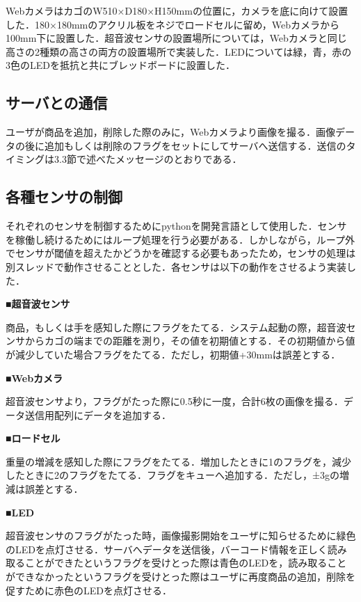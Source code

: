WebカメラはカゴのW510×D180×H150mmの位置に，カメラを底に向けて設置した．180×180mmのアクリル板をネジでロードセルに留め，Webカメラから100mm下に設置した．超音波センサの設置場所については，Webカメラと同じ高さの2種類の高さの両方の設置場所で実装した．LEDについては緑，青，赤の3色のLEDを抵抗と共にブレッドボードに設置した．

\subsection*{サーバとの通信}

ユーザが商品を追加，削除した際のみに，Webカメラより画像を撮る．画像データの後に追加もしくは削除のフラグをセットにしてサーバへ送信する．送信のタイミングは3.3節で述べたメッセージのとおりである．

\subsection*{各種センサの制御}

それぞれのセンサを制御するためにpythonを開発言語として使用した．センサを稼働し続けるためにはループ処理を行う必要がある．しかしながら，ループ外でセンサが閾値を超えたかどうかを確認する必要もあったため，センサの処理は別スレッドで動作させることとした．各センサは以下の動作をさせるよう実装した．

\noindent
{\bf ■超音波センサ}

商品，もしくは手を感知した際にフラグをたてる．システム起動の際，超音波センサからカゴの端までの距離を測り，その値を初期値とする．その初期値から値が減少していた場合フラグをたてる．ただし，初期値+30mmは誤差とする．

\noindent
{\bf ■Webカメラ}

超音波センサより，フラグがたった際に0.5秒に一度，合計6枚の画像を撮る．データ送信用配列にデータを追加する．

\noindent
{\bf ■ロードセル}

重量の増減を感知した際にフラグをたてる．増加したときに1のフラグを，減少したときに2のフラグをたてる．フラグをキューへ追加する．ただし，±3gの増減は誤差とする．

\noindent
{\bf ■LED}

超音波センサのフラグがたった時，画像撮影開始をユーザに知らせるために緑色のLEDを点灯させる．サーバへデータを送信後，バーコード情報を正しく読み取ることができたというフラグを受けとった際は青色のLEDを，読み取ることができなかったというフラグを受けとった際はユーザに再度商品の追加，削除を促すために赤色のLEDを点灯させる．

\newpage



